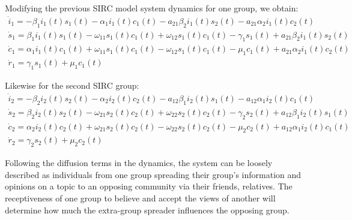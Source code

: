 \noindent Modifying the previous SIRC model system dynamics for one group, we obtain:\\
\begin{equation}\label{eqn:SIRC1_dynamics}
\left.\begin{aligned}
\dot{i}_1 = -\beta_1 i_1(t)s_1(t) - \alpha_1 i_1(t)c_1(t) - a_{21} \beta_2 i_1(t)s_2(t) - a_{21} \alpha_2 i_1(t)c_2(t)\\
\dot{s}_1 = \beta_1 i_1(t)s_1(t) - \omega_{11} s_1(t)c_1(t) + \omega_{12} s_1(t)c_1(t) - \gamma_1 s_1(t) + a_{21} \beta_2 i_1(t)s_2(t)\\
\dot{c}_1 = \alpha_1 i_1(t)c_1(t) + \omega_{11} s_1(t)c_1(t) - \omega_{12} s_1(t)c_1(t) - \mu_1 c_1(t) + a_{21} \alpha_2 i_1(t)c_2(t)\\
\dot{r}_1 = \gamma_1 s_1(t) + \mu_1 c_1(t)
\end{aligned}\right.
\end{equation}

\noindent Likewise for the second SIRC group:\\

\begin{equation}\label{eqn:SIRC2_dynamics}
\left.\begin{aligned}
\dot{i}_2 = -\beta_2 i_2(t)s_2(t) - \alpha_2 i_2(t)c_2(t) - a_{12} \beta_1 i_2(t)s_1(t) - a_{12} \alpha_1 i_2(t)c_1(t)\\
\dot{s}_2 = \beta_2 i_2(t)s_2(t) - \omega_{21} s_2(t)c_2(t) + \omega_{22} s_2(t)c_2(t) - \gamma_2 s_2(t) + a_{12} \beta_1 i_2(t)s_1(t)\\
\dot{c}_2 = \alpha_2 i_2(t)c_2(t) + \omega_{21} s_2(t)c_2(t) - \omega_{22} s_2(t)c_2(t) - \mu_2 c_2(t) + a_{12} \alpha_1 i_2(t)c_1(t)\\
\dot{r}_2 = \gamma_2 s_2(t) + \mu_2 c_2(t)
\end{aligned}\right.
\end{equation}

Following the diffusion terms in the dynamics, the system can be loosely described as individuals from one group spreading their group's information and opinions on a topic to an opposing community via their friends, relatives. The receptiveness of one group to believe and accept the views of another will determine how much the extra-group spreader influences the opposing group.

